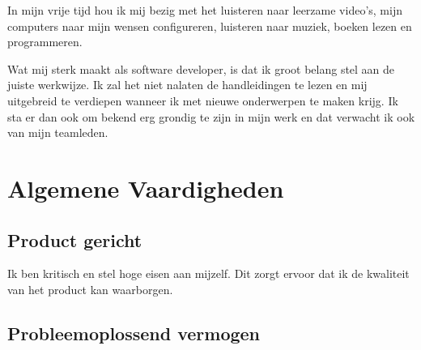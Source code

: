 \documentclass[
	10pt, %
]{FreemanCV}
\begin{document}
\begin{paracol}{2}
	In mijn vrije tijd hou ik mij bezig met het luisteren naar leerzame
	video's, mijn computers naar mijn wensen configureren, luisteren naar
	muziek, boeken lezen en programmeren.

	Wat mij sterk maakt als software developer, is dat ik groot belang stel
	aan de juiste werkwijze. Ik zal het niet nalaten de handleidingen te
	lezen en mij uitgebreid te verdiepen wanneer ik met nieuwe onderwerpen
	te maken krijg. Ik sta er dan ook om bekend erg grondig te zijn in mijn
	werk en dat verwacht ik ook van mijn teamleden.








	\section{Algemene Vaardigheden}

	\subsection{Product gericht}

	Ik ben kritisch en stel hoge eisen aan mijzelf. Dit zorgt ervoor dat ik
	de kwaliteit van het product kan waarborgen. 

	\subsection{Probleemoplossend vermogen}


\end{paracol}
\end{document}
